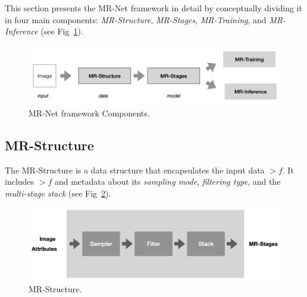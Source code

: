 
This section presents the MR-Net framework in detail by conceptually dividing it in four main components: \emph{MR-Structure}, \emph{MR-Stages}, \emph{MR-Training}, and \emph{MR-Inference} (see Fig~\ref{f:components}). 


\begin{figure}[!h]
\centering
\includegraphics[width=0.99\linewidth]{img/ch4/mr-net-components.png}
\caption{MR-Net framework Components.}
\label{f:components}
\end{figure}


\subsection{MR-Structure}\label{sec:mr_struct}

The MR-Structure is a data structure that encapsulates the input data $\gt{f}$. It includes $\gt{f}$ and metadata about its \textit{sampling mode}, \textit{filtering type}, and the \textit{multi-stage stack} (see Fig~\ref{f:structure}).
\begin{figure}[!h]
\centering
\includegraphics[width=0.89\linewidth]{img/ch4/mr-structure.png}
\caption{MR-Structure.}
\label{f:structure}
\end{figure}

